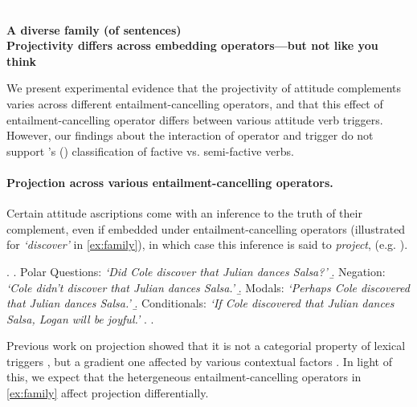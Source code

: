 \documentclass[12pt, a4paper]{scrartcl}
\newcommand{\posscite}[1]{\citeauthor{#1}'s (\citeyear{#1})}
\begin{document}

\textcolor{white}{.} \vspace{-2.9\baselineskip} \\
\begin{center}
	\textbf{\large%
		A diverse family (of sentences)\\ Projectivity differs across embedding operators---but not like you think}
\end{center}

\vspace{-.5\baselineskip}
\noindent We present experimental evidence that the projectivity of attitude complements varies across different entailment-cancelling operators, and that this effect of entailment-cancelling operator differs between various attitude verb triggers. However, our findings about the interaction of operator and trigger do not support \posscite{karttunen_observations_1971} classification of factive vs. semi-factive verbs.

\vspace{-\baselineskip}
\paragraph{Projection across various entailment-cancelling operators.}
	Certain attitude ascriptions come with an inference to the truth of their complement, even if embedded under entailment-cancelling operators (illustrated for \emph{\lq discover\rq} in \ref{ex:family}), in which case this inference is said to \emph{project}, (e.g. \citealp{karttunen_observations_1971}).

	\vspace{-.25\baselineskip}
	\ex. \label{ex:family}
		\a. Polar Questions: \hfill
			\emph{\lq Did Cole discover that Julian dances Salsa?\rq}
		\b. Negation: \hfill
			\emph{\lq Cole didn't discover that Julian dances Salsa.\rq}
		\b. Modals: \hfill
			\emph{\lq Perhaps Cole discovered that Julian dances Salsa.\rq}
		\b. Conditionals: \hfill
			\emph{\lq If Cole discovered that Julian dances Salsa, Logan will be joyful.\rq}
		\z.
	\z.

	\vspace{-.25\baselineskip}
	Previous work on projection showed that it is not a categorial property of lexical triggers \citep{tonhauser_how_2018}, but a gradient one affected by various contextual factors \citep{simons_what_2010,de_marneffe_did_2012,beaver_questions_2017,degen_prior_2021}. In light of this, we expect that the hetergeneous entailment-cancelling operators in \ref{ex:family} affect projection differentially.
\end{document}
